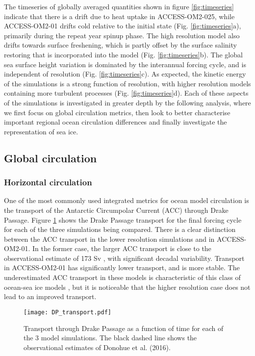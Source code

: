 \documentclass[gmd, manuscript]{copernicus}
\begin{document}
The timeseries of globally averaged quantities shown in figure \ref{fig:timeseries} indicate that there is a drift due to  heat uptake in ACCESS-OM2-025, while ACCESS-OM2-01 drifts cold relative to the initial state (Fig. \ref{fig:timeseries}a), primarily during the repeat year spinup phase.
The high resolution model also drifts towards surface freshening, which is partly offset by the surface salinity restoring that is incorporated into the model (Fig. \ref{fig:timeseries}b).
The global sea surface height variation is dominated by the interannual forcing cycle, and is independent of resolution (Fig. \ref{fig:timeseries}c). 
As expected, the kinetic energy of the simulations is a strong function of resolution, with higher resolution models containing more turbulent processes (Fig. \ref{fig:timeseries}d).
Each of these aspects of the simulations is investigated in greater depth by the following analysis, where we first focus on global circulation metrics, then look to better characterise important regional ocean circulation differences and finally investigate the representation of sea ice.

\subsection{Global circulation}

\subsubsection{Horizontal circulation}
One of the most commonly used integrated metrics for ocean model circulation is the transport of the Antarctic Circumpolar Current (ACC) through Drake Passage.
Figure \ref{fig:drake} shows the Drake Passage transport for the final forcing cycle for each of the three simulations being compared.
There is a clear distinction between the ACC transport in the lower resolution simulations and in ACCESS-OM2-01.
In the former case, the larger ACC transport is close to the observational estimate of 173 Sv \citep[black dashed line; ][]{Donohue2016}, with significant decadal variability. 
Transport in ACCESS-OM2-01 has significantly lower transport, and is more stable. 
The underestimated ACC transport in these models is characteristic of this class of ocean-sea ice models \citep[e.g.][]{Farneti2015}, but it is noticeable that the higher resolution case does not lead to an improved transport.

\begin{figure}[t]
\texttt{[image: DP\_transport.pdf]}
\caption{Transport through Drake Passage as a function of time for each of the 3 model simulations. The black dashed line shows the observational estimates of Donohue et al. (2016). \label{fig:drake}}
\end{figure}
\end{document}

